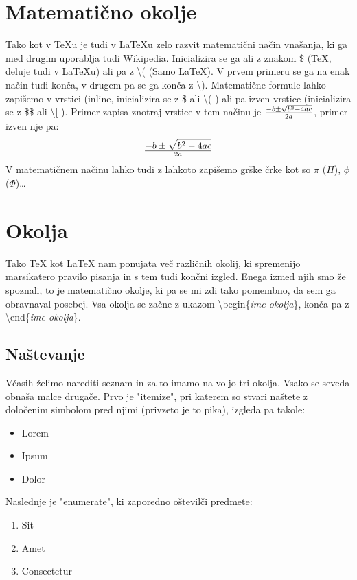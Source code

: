 \documentclass[a4paper]{book}
\newcommand\tbs{\textbackslash{}}
\begin{document}
\section{Matematično okolje}
Tako kot v \TeX{}u je tudi v \LaTeX{}u zelo razvit matematični način vnašanja, ki ga med drugim uporablja tudi Wikipedia. Inicializira se ga ali z znakom \${} (\TeX{}, deluje tudi v \LaTeX{}u) ali pa z \tbs{}( (Samo \LaTeX{}). V prvem primeru se ga na enak način tudi konča, v drugem pa se ga konča z \tbs{}). Matematične formule lahko zapišemo v vrstici (inline, inicializira se z \${} ali \tbs{}( ) ali pa izven vrstice (inicializira se z \${}\${} ali \tbs{}[ ). Primer zapisa znotraj vrstice v tem načinu je \(- b \pm \sqrt{b^2 - 4ac} \over 2a\), primer izven nje pa: \[- b \pm \sqrt{b^2 - 4ac} \over 2a\] V matematičnem načinu lahko tudi z lahkoto zapišemo grške črke kot so $\pi{}$ ($\Pi{}$), $\phi{}$ ($\Phi{}$)\ldots


\section{Okolja}

Tako \TeX{} kot \LaTeX{} nam ponujata več različnih okolij, ki spremenijo marsikatero pravilo pisanja in s tem tudi končni izgled. Enega izmed njih smo že spoznali, to je matematično okolje, ki pa se mi zdi tako pomembno, da sem ga obravnaval posebej. Vsa okolja se začne z ukazom \tbs{}begin\{{\em ime okolja}\}, konča pa z \tbs{}end\{{\em ime okolja}\}.

\subsection{Naštevanje}
Včasih želimo narediti seznam in za to imamo na voljo tri okolja. Vsako se seveda obnaša malce drugače. Prvo je "itemize", pri katerem so stvari naštete z določenim simbolom pred njimi (privzeto je to pika), izgleda pa takole:
\begin{itemize}
\item Lorem
\item Ipsum
\item Dolor
\end{itemize}

Naslednje je "enumerate", ki zaporedno oštevilči predmete:
\begin{enumerate}
\item Sit
\item Amet
\item Consectetur
\end{enumerate}
\end{document}
